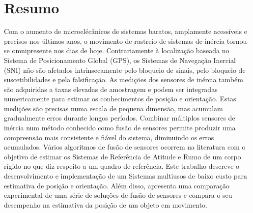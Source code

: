\chapter*{Resumo}
\justify
Com o aumento de microelécânicos de sistemas baratos, amplamente acessíveis e precisos nos últimos anos, o movimento de rastreio de sistemas de inércia tornou-se omnipresente nos dias de hoje. Contrariamente à localização baseada no Sistema de Posicionamento Global (GPS), os Sistemas de Navegação Inercial (SNI) não são afetados intrinsecamente pelo bloqueio de sinais, pelo bloqueio de suscetibilidades e pela falsificação. As medições dos sensores de inércia também são adquiridas a taxas elevadas de amostragem e podem ser integradas numericamente para estimar os conhecimentos de posição e orientação. Estas medições são precisas numa escala de pequena dimensão, mas acumulam gradualmente erros durante longos períodos. Combinar múltiplos sensores de inércia num método conhecido como fusão de sensores permite produzir uma compreensão mais consistente e fiável do sistema, diminuindo os erros acumulados. Vários algoritmos de fusão de sensores ocorrem na literatura com o objetivo de estimar os Sistemas de Referência de Atitude e Rumo de um corpo rígido no que diz respeito a um quadro de referência. Este trabalho descreve o desenvolvimento e implementação de um Sistemas multiusos de baixo custo para estimativa de posição e orientação. Além disso, apresenta uma comparação experimental de uma série de soluções de fusão de sensores e compara o seu desempenho na estimativa da posição de um objeto em movimento.

